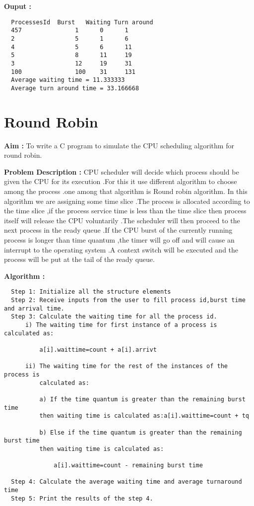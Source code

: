 \documentclass[journal,onecolumn]{IEEEtran}
\begin{document}
\textbf{Ouput :}
\begin{verbatim}
  ProcessesId  Burst   Waiting Turn around 
  457               1      0      1
  2                 5      1      6
  4                 5      6      11
  5                 8      11     19
  3                 12     19     31
  100               100    31     131
  Average waiting time = 11.333333
  Average turn around time = 33.166668
\end{verbatim}



\section{Round Robin}
\textbf{Aim : } To write a C program to simulate the CPU scheduling algorithm for round robin.

\textbf{Problem Description : }
CPU scheduler will decide which process should be given the CPU for its execution .For
this it use different algorithm to choose among the process .one among that algorithm is Round
robin algorithm.
In this algorithm we are assigning some time slice .The process is allocated according to
the time slice ,if the process service time is less than the time slice then process itself will release
the CPU voluntarily .The scheduler will then proceed to the next process in the ready queue .If
the CPU burst of the currently running process is longer than time quantum ,the timer will go off
and will cause an interrupt to the operating system .A context switch will be executed and the
process will be put at the tail of the ready queue.

\textbf{Algorithm : }
\begin{verbatim}
  Step 1: Initialize all the structure elements
  Step 2: Receive inputs from the user to fill process id,burst time and arrival time. 
  Step 3: Calculate the waiting time for all the process id.
      i) The waiting time for first instance of a process is calculated as:

          a[i].waittime=count + a[i].arrivt
      
      ii) The waiting time for the rest of the instances of the process is 
          calculated as:
          
          a) If the time quantum is greater than the remaining burst time
          then waiting time is calculated as:a[i].waittime=count + tq
          
          b) Else if the time quantum is greater than the remaining burst time 
          then waiting time is calculated as:
            
              a[i].waittime=count - remaining burst time
  
  Step 4: Calculate the average waiting time and average turnaround time
  Step 5: Print the results of the step 4.  
\end{verbatim}
\end{document}
